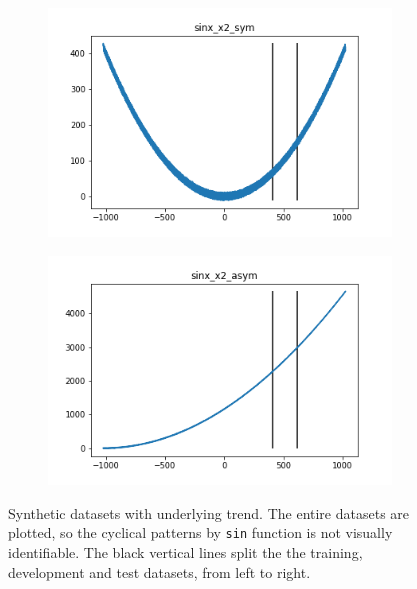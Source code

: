 \begin{figure}[ht]
\begin{subfigure}{0.45\textwidth}
    \end{subfigure}
    \begin{subfigure}{0.45\textwidth}
        \includegraphics[width=\textwidth]{img/data_sinx_x2_sym.png}
    \end{subfigure}
    \begin{subfigure}{0.45\textwidth}
        \includegraphics[width=\textwidth]{img/data_sinx_x2_asym.png}
    \end{subfigure}
    \caption{Synthetic datasets with underlying trend. 
    The entire datasets are plotted, so the cyclical patterns by \texttt{sin} function is not visually identifiable. 
    The black vertical lines split the the training, development and test datasets, from left to right.}
\end{figure}

